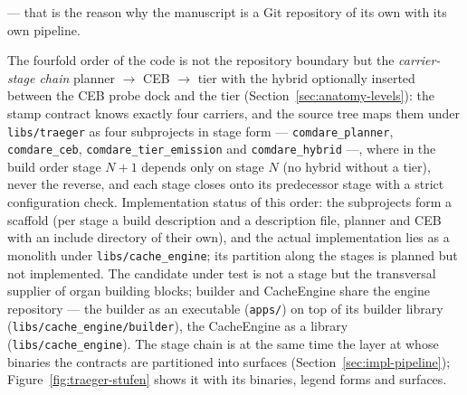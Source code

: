 \begin{nurlang}
\begin{itemize}
  --- that is the reason why the manuscript is a Git repository of its own with its own pipeline.
\end{itemize}
The fourfold order of the code is not the repository boundary but the \emph{carrier-stage chain}
planner $\to$ CEB $\to$ tier with the hybrid optionally inserted between the CEB probe dock and the tier
(Section~\ref{sec:anatomy-levels}): the stamp contract knows exactly four carriers, and the source tree
maps them under \texttt{libs/traeger} as four subprojects in stage form --- \texttt{comdare\_planner},
\texttt{comdare\_ceb}, \texttt{comdare\_tier\_emission} and \texttt{comdare\_hybrid} ---, where in the
build order stage $N+1$ depends only on stage $N$ (no hybrid without a tier), never the reverse, and each
stage closes onto its predecessor stage with a strict
configuration check. Implementation status of this order: the subprojects form a scaffold (per stage a
build description and a description file, planner and CEB with an include directory of their own), and
the actual implementation lies as a monolith under \texttt{libs/\allowbreak{}cache\_\allowbreak{}engine};
its partition along the stages is planned but not implemented. The candidate under test is not a stage but the
transversal supplier of organ building blocks; builder and CacheEngine share the engine repository ---
the builder as an executable (\texttt{apps/}) on top of its builder library
(\texttt{libs/\allowbreak{}cache\_\allowbreak{}engine/\allowbreak{}builder}), the CacheEngine as a library
(\texttt{libs/\allowbreak{}cache\_\allowbreak{}engine}). The stage chain is at the same time the layer at
whose binaries the contracts are partitioned into surfaces (Section~\ref{sec:impl-pipeline});
Figure~\ref{fig:traeger-stufen} shows it with its binaries, legend forms and surfaces.
\begin{figure}[htbp]\centering
{}
\end{figure}
\end{nurlang}
